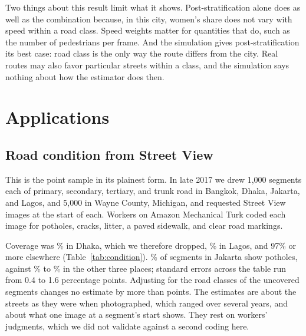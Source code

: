 \documentclass[11pt]{article}
\begin{document}
Two things about this result limit what it shows. Post-stratification alone does as well as the combination because, in this city, women's share does not vary with speed within a road class. Speed weights matter for quantities that do, such as the number of pedestrians per frame. And the simulation gives post-stratification its best case: road class is the only way the route differs from the city. Real routes may also favor particular streets within a class, and the simulation says nothing about how the estimator does then.

\section{Applications}

\subsection{Road condition from Street View}

This is the point sample in its plainest form. In late 2017 we drew 1,000 segments each of primary, secondary, tertiary, and trunk road in Bangkok, Dhaka, Jakarta, and Lagos, and 5,000 in Wayne County, Michigan, and requested Street View images at the start of each. Workers on Amazon Mechanical Turk coded each image for potholes, cracks, litter, a paved sidewalk, and clear road markings.

\begin{table}[H]
\centering
\caption{Condition of major roads from Street View images at sampled road segments. Entries are percentages of segments. The frame is primary, secondary, tertiary, and trunk roads cut into 500-meter segments; ``Covered'' is the share of sampled segments for which Street View returned an image. Estimates are post-stratified to the drawn sample's mix of road classes.}
\label{tab:condition}
\end{table}

Coverage was \dhakacovered\% in Dhaka, which we therefore dropped, \lagoscovered\% in Lagos, and 97\% or more elsewhere (Table~\ref{tab:condition}). \conditionjakartapothole\% of segments in Jakarta show potholes, against \conditionbangkokpothole\% to \conditionwaynepothole\% in the other three places; standard errors across the table run from 0.4 to 1.6 percentage points. Adjusting for the road classes of the uncovered segments changes no estimate by more than \conditionmaxadjustment{} points. The estimates are about the streets as they were when photographed, which ranged over several years, and about what one image at a segment's start shows. They rest on workers' judgments, which we did not validate against a second coding here.
\end{document}
